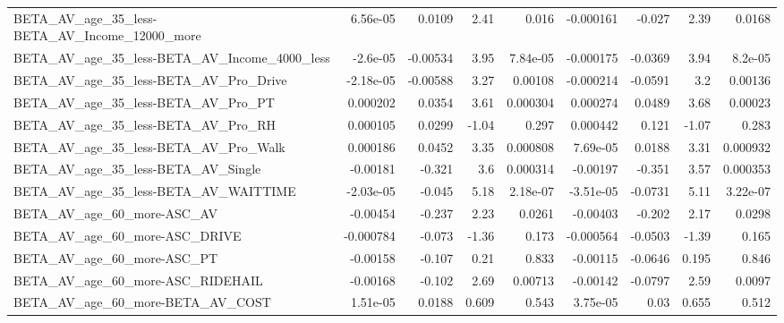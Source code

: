 \begin{tabular}{lrrrrrrrr}
BETA\_AV\_age\_35\_less-BETA\_AV\_Income\_12000\_more      &    6.56e-05 &       0.0109 &      2.41 &    0.016 &  -0.000161 &      -0.027 &         2.39 &        0.0168 \\
BETA\_AV\_age\_35\_less-BETA\_AV\_Income\_4000\_less       &    -2.6e-05 &     -0.00534 &      3.95 & 7.84e-05 &  -0.000175 &     -0.0369 &         3.94 &       8.2e-05 \\
BETA\_AV\_age\_35\_less-BETA\_AV\_Pro\_Drive              &   -2.18e-05 &     -0.00588 &      3.27 &  0.00108 &  -0.000214 &     -0.0591 &          3.2 &       0.00136 \\
BETA\_AV\_age\_35\_less-BETA\_AV\_Pro\_PT                 &    0.000202 &       0.0354 &      3.61 & 0.000304 &   0.000274 &      0.0489 &         3.68 &       0.00023 \\
BETA\_AV\_age\_35\_less-BETA\_AV\_Pro\_RH                 &    0.000105 &       0.0299 &     -1.04 &    0.297 &   0.000442 &       0.121 &        -1.07 &         0.283 \\
BETA\_AV\_age\_35\_less-BETA\_AV\_Pro\_Walk               &    0.000186 &       0.0452 &      3.35 & 0.000808 &   7.69e-05 &      0.0188 &         3.31 &      0.000932 \\
BETA\_AV\_age\_35\_less-BETA\_AV\_Single                 &    -0.00181 &       -0.321 &       3.6 & 0.000314 &   -0.00197 &      -0.351 &         3.57 &      0.000353 \\
BETA\_AV\_age\_35\_less-BETA\_AV\_WAITTIME               &   -2.03e-05 &       -0.045 &      5.18 & 2.18e-07 &  -3.51e-05 &     -0.0731 &         5.11 &      3.22e-07 \\
BETA\_AV\_age\_60\_more-ASC\_AV                         &    -0.00454 &       -0.237 &      2.23 &   0.0261 &   -0.00403 &      -0.202 &         2.17 &        0.0298 \\
BETA\_AV\_age\_60\_more-ASC\_DRIVE                      &   -0.000784 &       -0.073 &     -1.36 &    0.173 &  -0.000564 &     -0.0503 &        -1.39 &         0.165 \\
BETA\_AV\_age\_60\_more-ASC\_PT                         &    -0.00158 &       -0.107 &      0.21 &    0.833 &   -0.00115 &     -0.0646 &        0.195 &         0.846 \\
BETA\_AV\_age\_60\_more-ASC\_RIDEHAIL                   &    -0.00168 &       -0.102 &      2.69 &  0.00713 &   -0.00142 &     -0.0797 &         2.59 &        0.0097 \\
BETA\_AV\_age\_60\_more-BETA\_AV\_COST                   &    1.51e-05 &       0.0188 &     0.609 &    0.543 &   3.75e-05 &        0.03 &        0.655 &         0.512 \\

\end{tabular}
